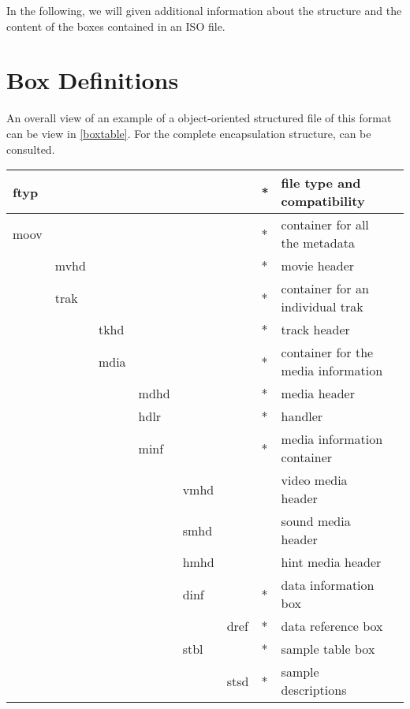 In the following, we will given additional information about the structure and the content of the boxes contained in an ISO file.

\section{Box Definitions}

An overall view of an example of a object-oriented structured file of this format can be view in \ref{boxtable}. For the complete encapsulation structure, \cite{iso} can be consulted.

\begin{table}[]
\centering
\begin{tabular}{|l|l|l|l|l|l|l|l|l}
\hline
  ftyp &      &      &      &      &      & * & file type and compatibility\\ \hline
  moov &      &      &      &      &      & * & container for all the metadata \\ \hline
       & mvhd &      &      &      &      & * & movie header \\ \hline
       & trak &      &      &      &      & * & container for an individual trak \\ \hline
       &      & tkhd &      &      &      & * & track header\\ \hline
       &      & mdia &      &      &      & * & container for the media information \\ \hline
       &      &      & mdhd &      &      & * & media header \\ \hline
       &      &      & hdlr &      &      & * & handler \\ \hline
       &      &      & minf &      &      & * & media information container \\ \hline
       &      &      &      & vmhd &      &   & video media header \\ \hline
       &      &      &      & smhd &      &   & sound media header \\ \hline
       &      &      &      & hmhd &      &   & hint media header \\ \hline
       &      &      &      & dinf &      & * & data information box \\ \hline
       &      &      &      &      & dref & * & data reference box \\ \hline
       &      &      &      & stbl &      & * & sample table box \\ \hline
       &      &      &      &      & stsd & * & sample descriptions \\ \hline

\end{tabular}
\end{table}
